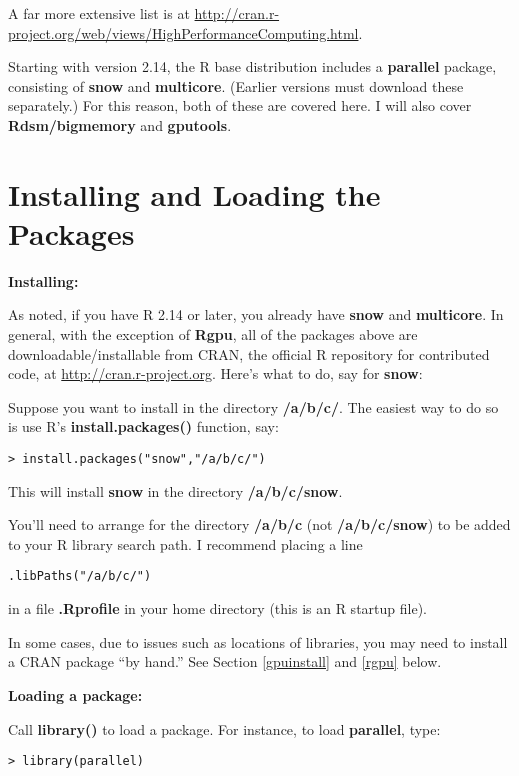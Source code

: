 A far more extensive list is at
\url{http://cran.r-project.org/web/views/HighPerformanceComputing.html}.

Starting with version 2.14, the R base distribution includes a {\bf
parallel} package, consisting of {\bf snow} and {\bf multicore}.
(Earlier versions must download these separately.)  For this reason,
both of these are covered here.  I will also cover {\bf Rdsm/bigmemory}
and {\bf gputools}.

\section{Installing and Loading the Packages}

{\bf Installing:}

As noted, if you have R 2.14 or later, you already have {\bf snow} and
{\bf multicore}.  In general, with the exception of {\bf Rgpu}, all of
the packages above are downloadable/installable from CRAN, the official
R repository for contributed code, at \url{http://cran.r-project.org}.
Here's what to do, say for {\bf snow}:

Suppose you want to install in the directory {\bf /a/b/c/}.  The easiest
way to do so is use R's {\bf install.packages()} function, say:

\begin{lstlisting}
> install.packages("snow","/a/b/c/")
\end{lstlisting}

This will install {\bf snow} in the directory {\bf /a/b/c/{\bf snow}}.

You'll need to arrange for the directory {\bf /a/b/c} (not {\bf
/a/b/c/snow}) to be added to your R library search path.  I recommend
placing a line

\begin{lstlisting}
.libPaths("/a/b/c/")
\end{lstlisting}

in a file {\bf .Rprofile} in your home directory (this is an R startup
file).

In some cases, due to issues such as locations of libraries, you may
need to install a CRAN package ``by hand.''  See Section \ref{gpuinstall}
and \ref{rgpu} below.

{\bf Loading a package:}

Call {\bf library()} to load a package.  For instance, to load {\bf
parallel}, type:

\begin{lstlisting}
> library(parallel)
\end{lstlisting}


